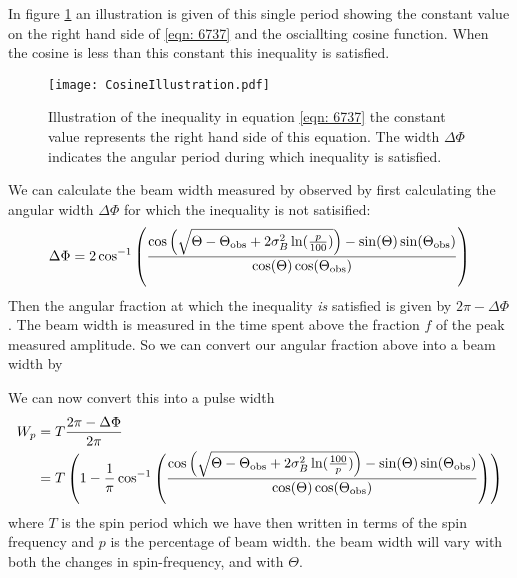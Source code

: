 \documentclass[/home/greg/Thesis/main/main.tex]{subfiles}
\begin{document}
In figure \ref{fig: CosineIllustration} an illustration is given of this single
period showing the constant value on the right hand side of \eqref{eqn: 6737} and
the osciallting cosine function. When the cosine is less than this constant
this inequality is satisfied.
\begin{figure}[h!]
\centering
\texttt{[image: CosineIllustration.pdf]}
\caption{Illustration of the inequality in equation \eqref{eqn: 6737} the constant
         value represents the right hand side of this equation. The
         width $\Delta\Phi$ indicates the angular period during which inequality
         is satisfied.}
\label{fig: CosineIllustration}
\end{figure}

We can calculate the beam width measured by observed by first calculating the
angular width $\Delta\Phi$ for which the inequality is not satisified:
\begin{equation}
    \Delta\Phi = 2\cos^{-1}\left(
                \frac{\cos\left(\sqrt{\Theta - \Theta_{\mathrm{obs}} + 2\sigma_{B}^{2} \ln(\frac{p}{100})}\right) - \sin(\Theta)\sin(\Theta_{\mathrm{obs}})}
                          {\cos(\Theta)\cos(\Theta_{\mathrm{obs}})}
                      \right)
\end{equation}
Then the angular fraction at which the inequality \emph{is} satisfied is given by
$2\pi - \Delta\Phi$. The beam width is measured in the time spent above the 
fraction $f$ of the peak measured amplitude. So we can convert our angular 
fraction above into a beam width by

We can now convert this into a pulse width 
\begin{align}
    W_p & = T \frac{2\pi - \Delta\Phi}{2\pi} \\
          & = T\left(1 -
               \frac{1}{\pi}\cos^{-1}\left(
                   \frac{\cos\left(\sqrt{\Theta - \Theta_{\mathrm{obs}} 
                         + 2\sigma_{B}^{2} \ln(\frac{100}{p})}\right)
                    - \sin(\Theta)\sin(\Theta_{\mathrm{obs}})}
                          {\cos(\Theta)\cos(\Theta_{\mathrm{obs}})}
                      \right)
                  \right)
\label{eqn: Wp}
\end{align}
where $T$ is the spin period which we have then written in terms of the spin
frequency and $p$ is the percentage of beam width. 
the beam width will vary with both the changes in spin-frequency, and with
$\Theta$.

\end{document}
